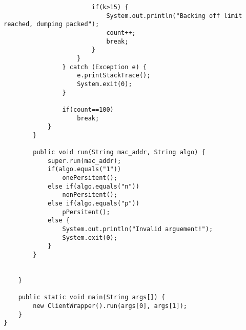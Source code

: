 \begin{verbatim}
						if(k>15) {
							System.out.println("Backing off limit reached, dumping packed");
							count++;
							break;
						}
					}
				} catch (Exception e) {
					e.printStackTrace();
					System.exit(0);
				}

				if(count==100)
					break;
			}
		}

		public void run(String mac_addr, String algo) {
			super.run(mac_addr);
			if(algo.equals("1"))
				onePersitent();
			else if(algo.equals("n"))
				nonPersitent();
			else if(algo.equals("p"))
				pPersitent();
			else {
				System.out.println("Invalid arguement!");
				System.exit(0);
			}
		}


	}

	public static void main(String args[]) {
		new ClientWrapper().run(args[0], args[1]);
	}
}
\end{verbatim}

